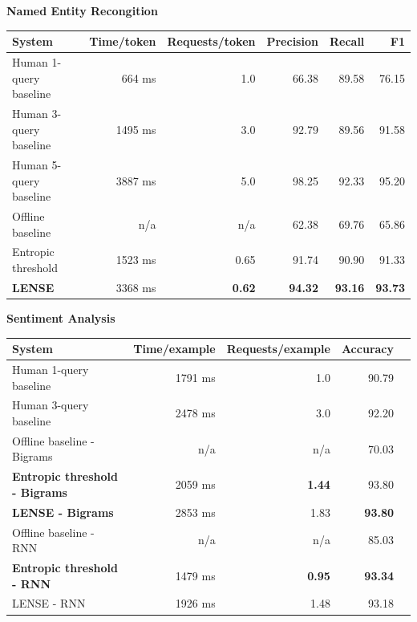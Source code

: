 \begin{table}[ht]
{\bf Named Entity Recongition} \\
\begin{tabular}{l r r r r r}
    \textbf{System} & \textbf{Time/token} & \textbf{Requests/token} & \textbf{Precision} & \textbf{Recall} & \textbf{F1} \\ \hline
    Human 1-query baseline & 664 ms & 1.0 & 66.38 & 89.58 & 76.15 \\ %
    Human 3-query baseline & 1495 ms & 3.0 & 92.79 & 89.56 & 91.58 \\ %
    Human 5-query baseline & 3887 ms & 5.0 & 98.25 & 92.33 & 95.20 \\ %
    Offline baseline & n/a & n/a & 62.38 & 69.76 & 65.86 \\ %
    Entropic threshold & 1523 ms & 0.65 & 91.74 & 90.90 & 91.33 \\ %
    \textbf{LENSE} & 3368 ms & \textbf{0.62} & \textbf{94.32} & \textbf{93.16} & \textbf{93.73} \\ %
\end{tabular}

{\bf Sentiment Analysis}\\
\begin{tabular}{l  r  r  r  r}
    \textbf{System} & \textbf{Time/example} & \textbf{Requests/example} & \textbf{Accuracy} \\ \hline
    Human 1-query baseline & 1791 ms & 1.0 & 90.79 \\ %
    Human 3-query baseline & 2478 ms & 3.0 & 92.20 \\ %
    Offline baseline - Bigrams & n/a & n/a & 70.03 \\ %
    \textbf{Entropic threshold - Bigrams} & 2059 ms & \textbf{1.44} & 93.80 \\ %
    \textbf{LENSE - Bigrams} & 2853 ms & 1.83 & \textbf{93.80} \\%
    Offline baseline - RNN & n/a & n/a & 85.03 \\ %
    \textbf{Entropic threshold - RNN} & 1479 ms & \textbf{0.95} & \textbf{93.34} \\ %
    LENSE - RNN & 1926 ms & 1.48 & 93.18 \\ %
\end{tabular}


\end{table}
